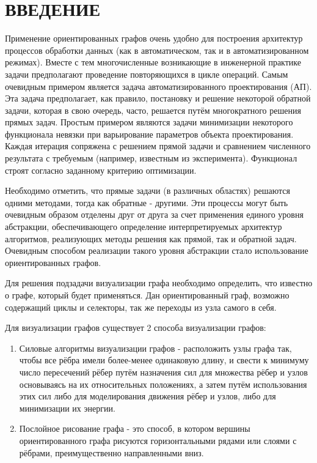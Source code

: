 \chapter*{ВВЕДЕНИЕ}\label{chap.introduction}

Применение ориентированных графов очень удобно для построения архитектур процессов обработки данных (как в автоматическом, так и в автоматизированном режимах). Вместе с тем многочисленные возникающие в инженерной практике задачи предполагают проведение повторяющихся в цикле операций. Самым очевидным примером является задача автоматизированного проектирования (АП). Эта задача предполагает, как правило, постановку и решение некоторой обратной задачи, которая в свою очередь, часто, решается путём многократного решения прямых задач. Простым примером являются задачи минимизации некоторого функционала невязки при варьирование параметров объекта проектирования. Каждая итерация сопряжена с решением прямой задачи и сравнением численного результата с требуемым (например, известным из эксперимента). Функционал строят согласно заданному критерию оптимизации. 

Необходимо отметить, что прямые задачи (в различных областях) решаются одними методами, тогда как обратные - другими. Эти процессы могут быть очевидным образом отделены друг от друга за счет применения единого уровня абстракции, обеспечивающего определение интерпретируемых архитектур  алгоритмов, реализующих методы решения как прямой, так и обратной задач. Очевидным способом реализации такого уровня абстракции стало использование ориентированных графов.

Для решения подзадачи визуализации графа необходимо определить, что известно о графе, который будет применяться. Дан ориентированный граф, возможно содержащий циклы и селекторы, так же переходы из узла самого в себя.

Для визуализации графов существует 2 способа визуализации графов:
\begin{enumerate}
\item Силовые алгоритмы визуализации графов - расположить узлы графа так, чтобы все рёбра имели более-менее одинаковую длину, и свести к минимуму число пересечений рёбер путём назначения сил для множества рёбер и узлов основываясь на их относительных положениях, а затем путём использования этих сил либо для моделирования движения рёбер и узлов, либо для минимизации их энергии.

\item Послойное рисование графа - это способ, в котором вершины ориентированного графа рисуются горизонтальными рядами или слоями с рёбрами, преимущественно направленными вниз.

\end{enumerate}


